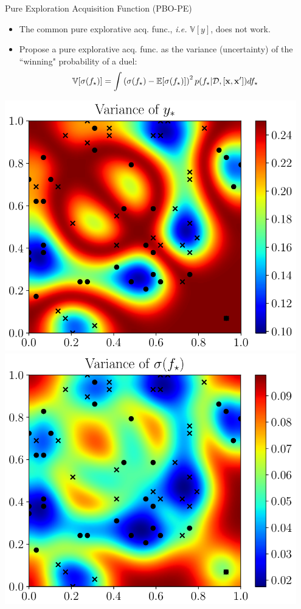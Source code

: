 \documentclass[13pt,aspectratio=1610]{beamer}
\newcommand{\E}{\mathbb{E}}
\newcommand{\V}{\mathbb{V}}
\begin{document}
\begin{frame}{Pure Exploration Acquisition Function (PBO-PE)}
\begin{minipage}{0.65\textwidth}
\begin{itemize}
\item The common pure explorative acq. func., \emph{i.e.} $\V[y]$, does not work.
\item Propose a pure explorative acq. func. as the variance (uncertainty) of the ``winning" probability of a duel:
$$
\V[ \sigma(f_{\star})]  = \int \left(\sigma(f_{\star}) - \E[ \sigma(f_{\star})] \right)^2 p (f_{\star} | \dataSet,  [\inputVector,\inputVector']) df_{\star} 
$$
\end{itemize}
\end{minipage}
%
\begin{minipage}{0.33\textwidth}
\centering 
\includegraphics[width=0.95\textwidth]{var_y_star_cropped.pdf} \\
\includegraphics[width=0.95\textwidth]{var_f_star_cropped.pdf}
\end{minipage}
\end{frame}
\end{document}
